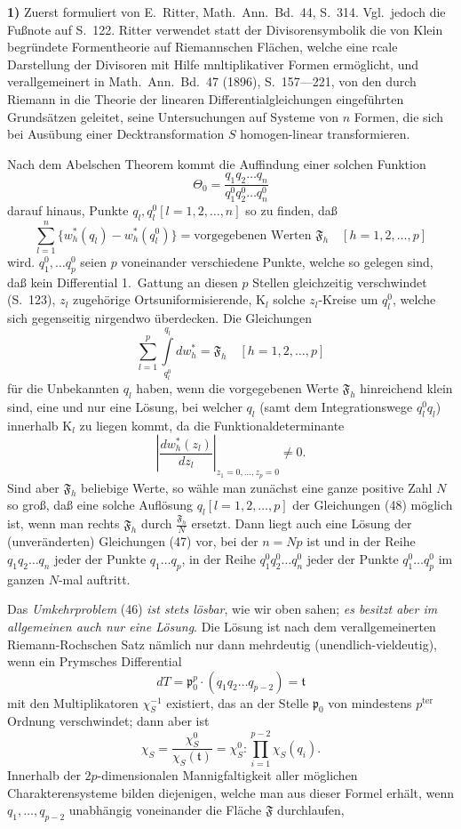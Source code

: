 \documentclass{article}
\begin{document}
\textbf{1)} Zuerst formuliert von E.~Ritter, Math.\ Ann.\ Bd.~44, S.~314. Vgl.\ jedoch die Fußnote auf S.~122. Ritter verwendet statt der Divisorensymbolik die von Klein begründete Formentheorie auf Riemannschen Flächen, welche eine rcale Darstellung der Divisoren mit Hilfe mnltiplikativer Formen ermöglicht, und verallgemeinert in Math.\ Ann.\ Bd.~47 (1896), S.~157---221, von den durch Riemann in die Theorie der linearen Differentialgleichungen eingeführten Grundsätzen geleitet, seine Untersuchungen auf Systeme von $n$ Formen, die sich bei Ausübung einer Decktransformation $S$ homogen-linear transformieren.

Nach dem Abelschen Theorem kommt die Auffindung einer solchen Funktion
\[ \Theta_0 = \frac{q_1 q_2 \dots q_n}{q_1^0 q_2^0 \dots q_n^0} \]
darauf hinaus, Punkte $q_l, q_l^0 [l = 1, 2, \dots, n]$ so zu finden, daß
\[ \sum_{l=1}^n \{ w_h^*(q_l) - w_h^*(q_l^0) \} = \text{vorgegebenen Werten } \mathfrak{F}_h \quad [h = 1, 2, \dots, p] \tag{47} \]
wird. $q_1^0, \dots q_p^0$ seien $p$ voneinander verschiedene Punkte, welche so gelegen sind, daß kein Differential 1.\ Gattung an diesen $p$ Stellen gleichzeitig verschwindet (S.~123), $z_l$ zugehörige Ortsuniformisierende, $\mathrm{K}_l$ solche $z_l$-Kreise um $q_l^0$, welche sich gegenseitig nirgendwo überdecken. Die Gleichungen
\[ \sum_{l=1}^p \int\limits_{q_l^0}^{q_l} dw_h^* = \mathfrak{F}_h \quad [h = 1, 2, \dots, p] \tag{48} \]
für die Unbekannten $q_l$ haben, wenn die vorgegebenen Werte $\mathfrak{F}_h$ hinreichend klein sind, eine und nur eine Lösung, bei welcher $q_l$ (samt dem Integrationswege $q_l^0 q_l$) innerhalb $\mathrm{K}_l$ zu liegen kommt, da die Funktionaldeterminante
\[ \left| \frac{dw_h^*(z_l)}{dz_l} \right|_{z_1 = 0, \dots, z_p = 0} \neq 0. \]
Sind aber $\mathfrak{F}_h$ beliebige Werte, so wähle man zunächst eine ganze positive Zahl $N$ so groß, daß eine solche Auflösung $q_l [l = 1, 2, \dots, p]$ der Gleichungen (48) möglich ist, wenn man rechts $\mathfrak{F}_h$ durch $\frac{\mathfrak{F}_h}{N}$ ersetzt. Dann liegt auch eine Lösung der (unveränderten) Gleichungen (47) vor, bei der $n = Np$ ist und in der Reihe $q_1 q_2 \dots q_n$ jeder der Punkte $q_1 \dots q_p$, in der Reihe $q_1^0 q_2^0 \dots q_n^0$ jeder der Punkte $q_1^0 \dots q_p^0$ im ganzen $N$-mal auftritt.

Das \emph{Umkehrproblem} (46) \emph{ist stets lösbar}, wie wir oben sahen; \emph{es besitzt aber im allgemeinen auch nur eine Lösung}. Die Lösung ist nach dem verallgemeinerten Riemann-Rochschen Satz nämlich nur dann mehrdeutig (unendlich-vieldeutig), wenn ein Prymsches Differential
\[ dT = \mathfrak{p}_0^p \cdot (q_1 q_2 \dots q_{p-2}) = \mathfrak{t} \]
mit den Multiplikatoren $\chi_S^{-1}$ existiert, das an der Stelle $\mathfrak{p}_0$ von mindestens $p^{\text{ter}}$ Ordnung verschwindet; dann aber ist
\[ \chi_S = \frac{\chi_S^0}{\chi_S(\mathfrak{t})} = \chi_S^0 : \prod_{i=1}^{p-2} \chi_S(q_i). \]
Innerhalb der $2p$-dimensionalen Mannigfaltigkeit aller möglichen Charakterensysteme bilden diejenigen, welche man aus dieser Formel erhält, wenn $q_1, \dots, q_{p-2}$ unabhängig voneinander die Fläche $\mathfrak{F}$ durchlaufen,
\end{document}

